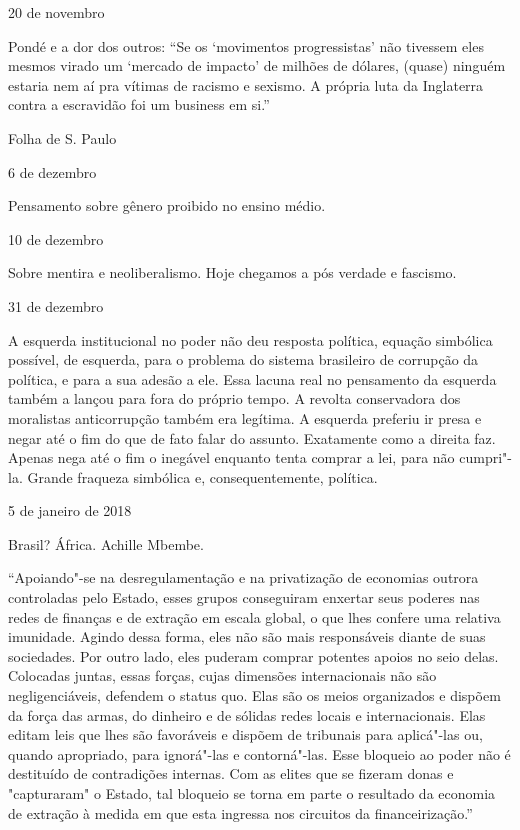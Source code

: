 \begin{flushright}
20 de novembro
\end{flushright}

Pondé e a dor dos outros: ``Se os `movimentos progressistas' não
tivessem eles mesmos virado um `mercado de impacto' de milhões de
dólares, (quase) ninguém estaria nem aí pra vítimas de racismo e
sexismo. A própria luta da Inglaterra contra a escravidão foi um
business em si.''

Folha de S. Paulo

\begin{flushright}
6 de dezembro
\end{flushright}

Pensamento sobre gênero proibido no ensino médio.

\begin{flushright}
10 de dezembro
\end{flushright}

Sobre mentira e neoliberalismo. Hoje chegamos a pós verdade e fascismo.

\begin{flushright}
31 de dezembro
\end{flushright}

A esquerda institucional no poder não deu resposta política, equação
simbólica possível, de esquerda, para o problema do sistema brasileiro
de corrupção da política, e para a sua adesão a ele. Essa lacuna real no
pensamento da esquerda também a lançou para fora do próprio tempo. A
revolta conservadora dos moralistas anticorrupção também era legítima. A
esquerda preferiu ir presa e negar até o fim do que de fato falar do
assunto. Exatamente como a direita faz. Apenas nega até o fim o inegável
enquanto tenta comprar a lei, para não cumpri"-la. Grande fraqueza
simbólica e, consequentemente, política.

\begin{flushright}
5 de janeiro de 2018
\end{flushright}

Brasil? África. Achille Mbembe.

``Apoiando"-se na desregulamentação e na privatização de economias
outrora controladas pelo Estado, esses grupos conseguiram enxertar seus
poderes nas redes de finanças e de extração em escala global, o que lhes
confere uma relativa imunidade. Agindo dessa forma, eles não são mais
responsáveis diante de suas sociedades. Por outro lado, eles puderam
comprar potentes apoios no seio delas. Colocadas juntas, essas forças,
cujas dimensões internacionais não são negligenciáveis, defendem o
status quo. Elas são os meios organizados e dispõem da força das armas,
do dinheiro e de sólidas redes locais e internacionais. Elas editam leis
que lhes são favoráveis e dispõem de tribunais para aplicá"-las ou,
quando apropriado, para ignorá"-las e contorná"-las. Esse bloqueio ao
poder não é destituído de contradições internas. Com as elites que se
fizeram donas e "capturaram" o Estado, tal bloqueio se torna em parte o
resultado da economia de extração à medida em que esta ingressa nos
circuitos da financeirização.''

